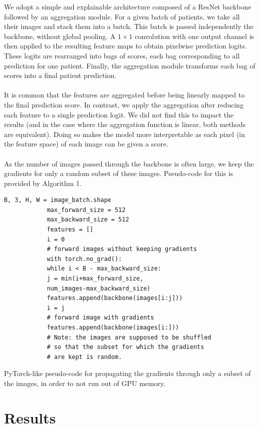 \documentclass[final]{cvpr}
\begin{document}
	We adopt a simple and explainable architecture composed of a ResNet \cite{resnet} backbone followed by an aggregation module.
	For a given batch of patients, we take all their images and stack them into a batch.
	This batch is passed independently the backbone, without global pooling. 
	A $1\times 1$ convolution with one output channel is then applied to the resulting feature maps to obtain pixelwise prediction logits.
	These logits are rearranged into bags of scores, each bag corresponding to all  prediction for one patient.
	Finally, the aggregation module transforms each bag of scores into a final patient prediction.\\
	\\
	It is common that the features are aggregated before being linearly mapped to the final prediction score.
	In contrast, we apply the aggregation after reducing each feature to a single prediction logit. We did not find this to impact the results (and in the case where the aggregation function is linear, both methods are equivalent). Doing so makes the model more interpretable as each pixel (in the feature space) of each image can be given a score. \\
	\\
	As the number of images passed through the backbone is often large, we keep the gradients for only a random subset of these images. Pseudo-code for this is provided by Algorithm 1.
	
	
	\begin{table}[h]
		\renewcommand\tablename{Pseudo-code}
		\begin{Verbatim}[fontsize=\footnotesize, samepage=true, frame=single]
			B, 3, H, W = image_batch.shape
			max_forward_size = 512
			max_backward_size = 512
			features = []
			i = 0
			# forward images without keeping gradients
			with torch.no_grad():
			while i < B - max_backward_size:
			j = min(i+max_forward_size,
			num_images-max_backward_size)
			features.append(backbone(images[i:j]))
			i = j
			# forward image with gradients
			features.append(backbone(images[i:]))
			# Note: the images are supposed to be shuffled
			# so that the subset for which the gradients
			# are kept is random.
		\end{Verbatim}
		\caption{PyTorch-like pseudo-code for propagating the gradients through only a subset of the images, in order to not run out of GPU memory.}
		\label{alg1}
	\end{table}

	\section{Results}
	
\end{document}

